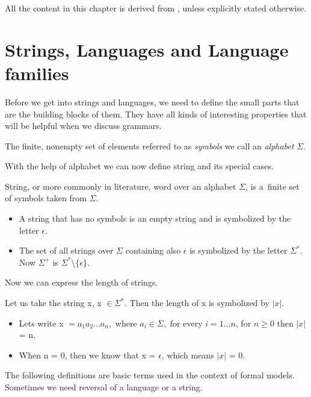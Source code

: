 All the content in this chapter is derived from \cite{LanguageTheory}, unless explicitly stated otherwise.

\section{Strings, Languages and Language families}
Before we get into strings and languages, we need to define the small parts that are the building blocks of them. They have all kinds of interesting properties that will be helpful when we discuss grammars.

\begin{definition}
\label{Def1}
The finite, nonempty set of elements referred to as \emph{symbols} we call an \emph{alphabet} \(\Sigma\).
\end{definition}

With the help of alphabet we can now define string and its special cases.
\begin{definition}
\label{Def2}
String, or more commonly in literature, word over an alphabet \(\Sigma\), is a~finite set of symbols taken from \(\Sigma\).
\begin{itemize}
  \item{A string that has no symbols is an empty string and is symbolized by the letter \(\epsilon\).}
  \item{The set of all strings over \(\Sigma\) containing also \(\epsilon\) is symbolized by the letter \(\Sigma^*\). Now \(\Sigma^+\) is $\Sigma^* \setminus \{\epsilon\}$.} 
\end{itemize}
\end{definition}

Now we can express the length of strings.

\begin{definition}
\label{Def3}
Let us take the string x, x $\in \Sigma^*$. Then the length of x is symbolized by $|x|$.
\begin{itemize}
  \item{Lets write x $= a_1a_2...a_n,$ where $a_i \in \Sigma,$ for every $i = 1...n$, for $n \geq 0$ then $|x|$ = n.}
  \item{When n = 0, then we know that x = \(\epsilon\), which means $|x|$ = 0.} 
\end{itemize}
\end{definition}

The following definitions are basic terms used in the context of formal models. Sometimes we need reversal of a language or a string.

